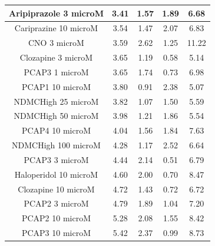 \documentclass[a4paper,12pt]{article}
\begin{document}
\begin{table}[h!]
\begin{tabular}{|c|c|c|c|c|}
Aripiprazole 3 microM  & 3.41 & 1.57 & 1.89 & 6.68  \\ \hline
Cariprazine 10 microM  & 3.54 & 1.47 & 2.07 & 6.83  \\ \hline
CNO 3 microM           & 3.59 & 2.62 & 1.25 & 11.22 \\ \hline
Clozapine 3 microM     & 3.65 & 1.19 & 0.58 & 5.14  \\ \hline
PCAP3 1 microM       & 3.65 & 1.74 & 0.73 & 6.98  \\ \hline
PCAP1 10 microM        & 3.80  & 0.91 & 2.38 & 5.07  \\ \hline
NDMCHigh 25 microM     & 3.82 & 1.07 & 1.50  & 5.59  \\ \hline
NDMCHigh 50 microM     & 3.98 & 1.21 & 1.86 & 5.54  \\ \hline
PCAP4 10 microM      & 4.04 & 1.56 & 1.84 & 7.63  \\ \hline
NDMCHigh 100 microM    & 4.28 & 1.17 & 2.52 & 6.64  \\ \hline
PCAP3 3 microM       & 4.44 & 2.14 & 0.51 & 6.79  \\ \hline
Haloperidol 10 microM  & 4.60  & 2.00    & 0.70  & 8.47  \\ \hline
Clozapine 10 microM    & 4.72 & 1.43 & 0.72 & 6.72  \\ \hline
PCAP2 3 microM         & 4.79 & 1.89 & 1.04 & 7.20   \\ \hline
PCAP2 10 microM        & 5.28 & 2.08 & 1.55 & 8.42  \\ \hline
PCAP3 10 microM      & 5.42 & 2.37 & 0.99 & 8.73  \\ \hline
\end{tabular}
\end{table}
\newpage
\end{document}
